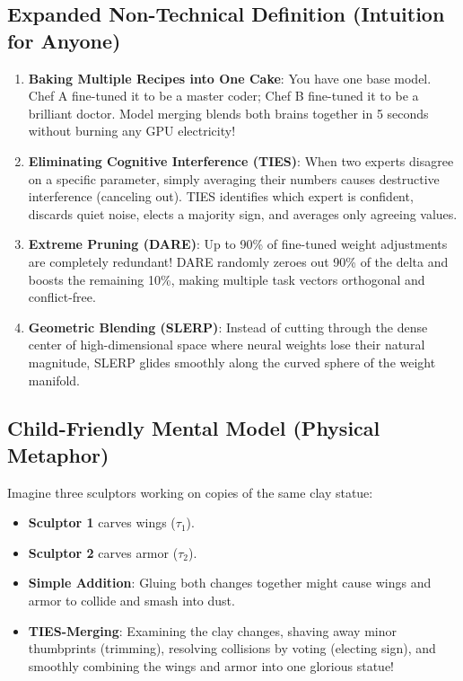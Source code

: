 \documentclass[11pt,a4paper]{article}
\theoremstyle{definition}
\begin{document}
\subsection{Expanded Non-Technical Definition (Intuition for Anyone)}
\begin{enumerate}
    \item \textbf{Baking Multiple Recipes into One Cake}: You have one base model. Chef A fine-tuned it to be a master coder; Chef B fine-tuned it to be a brilliant doctor. Model merging blends both brains together in 5 seconds without burning any GPU electricity!
    \item \textbf{Eliminating Cognitive Interference (TIES)}: When two experts disagree on a specific parameter, simply averaging their numbers causes destructive interference (canceling out). TIES identifies which expert is confident, discards quiet noise, elects a majority sign, and averages only agreeing values.
    \item \textbf{Extreme Pruning (DARE)}: Up to 90\% of fine-tuned weight adjustments are completely redundant! DARE randomly zeroes out 90\% of the delta and boosts the remaining 10\%, making multiple task vectors orthogonal and conflict-free.
    \item \textbf{Geometric Blending (SLERP)}: Instead of cutting through the dense center of high-dimensional space where neural weights lose their natural magnitude, SLERP glides smoothly along the curved sphere of the weight manifold.
\end{enumerate}

\subsection{Child-Friendly Mental Model (Physical Metaphor)}
Imagine three sculptors working on copies of the same clay statue:
\begin{itemize}
    \item \textbf{Sculptor 1} carves wings ($\tau_1$).
    \item \textbf{Sculptor 2} carves armor ($\tau_2$).
    \item \textbf{Simple Addition}: Gluing both changes together might cause wings and armor to collide and smash into dust.
    \item \textbf{TIES-Merging}: Examining the clay changes, shaving away minor thumbprints (trimming), resolving collisions by voting (electing sign), and smoothly combining the wings and armor into one glorious statue!
\end{itemize}
\end{document}
